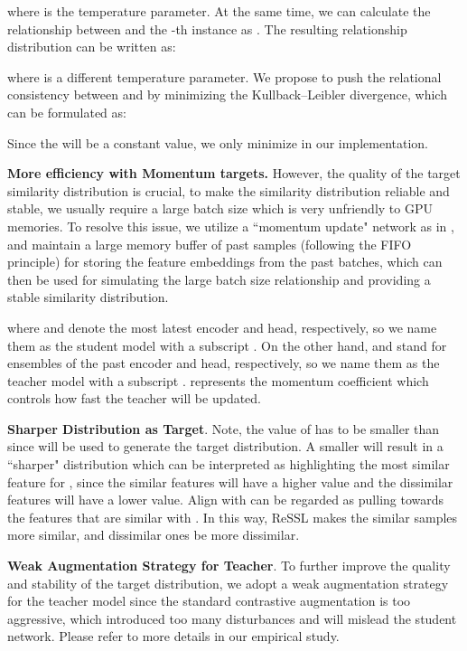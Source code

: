 \documentclass{article}
\newcommand{\<}{\left\langle}
\renewcommand{\>}{\right\rangle}
\begin{document}
where  is the temperature parameter. At the same time, we can calculate the relationship between  and the -th instance as . The resulting relationship distribution can be written as:

where  is a different temperature parameter. We propose to push the relational consistency between  and  by minimizing the Kullback–Leibler divergence, which can be formulated as:

Since the  will be a constant value, we only minimize  in our implementation.

\textbf{More efficiency with Momentum targets.} 
However, the quality of the target similarity distribution  is crucial, to make the similarity distribution reliable and stable, we usually require a large batch size which is very unfriendly to GPU memories. To resolve this issue, we utilize a ``momentum update" network as in \cite{moco, mocov2}, and maintain a large memory buffer  of  past samples  (following the FIFO principle) for storing the feature embeddings from the past batches, which can then be used for simulating the large batch size relationship and providing a stable similarity distribution. 

where  and  denote the most latest encoder and head, respectively, so we name them as the student model with a subscript . On the other hand,  and  stand for ensembles of the past encoder and head, respectively, so we name them as the teacher model with a subscript .  represents the momentum coefficient which controls how fast the teacher  will be updated.

\textbf{Sharper Distribution as Target}.
 Note, the value of  has to be smaller than  since  will be used to generate the target distribution. A smaller  will result in a ``sharper" distribution which can be interpreted as highlighting the most similar feature for , since the similar features will have a higher value and the dissimilar features will have a lower value. Align  with  can be regarded as pulling  towards the features that are similar with . In this way, ReSSL makes the similar samples more similar, and dissimilar ones be more dissimilar.

\textbf{Weak Augmentation Strategy for Teacher}.
To further improve the quality and stability of the target distribution, we adopt a weak augmentation strategy for the teacher model since the standard contrastive augmentation is too aggressive, which introduced too many disturbances and will mislead the student network. Please refer to more details in our empirical study. 
\end{document}
